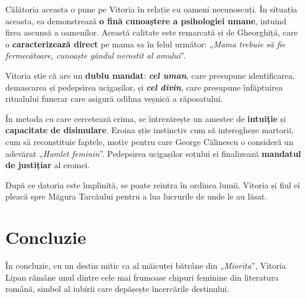 \documentclass{article}
\newcommand{\qu}[1]{„\emph{#1}”}
\begin{document}
Călătoria aceasta o pune pe Vitoria în relație cu oameni necunoscuți. În situația aceasta, ea demonstrează \textbf{o fină cunoaștere a psihologiei umane}, intuind firea ascunsă a oamenilor. Această calitate este remarcată și de Gheorghiță, care o \textbf{caracterizează direct} pe mama sa în felul următor: \qu{Mama trebuie să fie fermecătoare, cunoaște gândul nerostit al omului}.

Vitoria știe că are un \textbf{dublu mandat}: \textsl{\textbf{cel uman}}, care presupune identificarea, demascarea și pedepsirea ucigașilor, și \textsl{\textbf{cel divin}}, care presupune înfăptuirea ritualului funerar care asigură odihna veșnică a răposatului.

În metoda cu care cercetează crima, se întrezărește un amestec de \textbf{intuiție} și \textbf{capacitate de disimulare}. Eroina știe instinctiv cum să interogheze martorii, cum să reconstituie faptele, motiv pentru care George Călinescu o consideră un adevărat \qu{Hamlet feminin}. Pedepsirea ucigașilor soțului ei finalizează \textbf{mandatul de justițiar} al eroinei.

După ce datoria este împlinită, se poate reintra în ordinea lumii. Vitoria și fiul ei pleacă spre Măgura Tarcăului pentru a lua lucrurile de unde le au lăsat.
\section{Concluzie}
În concluzie, cu un destin mitic ca al măicuței bătrâne din \qu{Miorița}, Vitoria Lipan rămâne unul dintre cele mai frumoase chipuri feminine din literatura română, simbol al iubirii care depășește încercările destinului.
\end{document}
